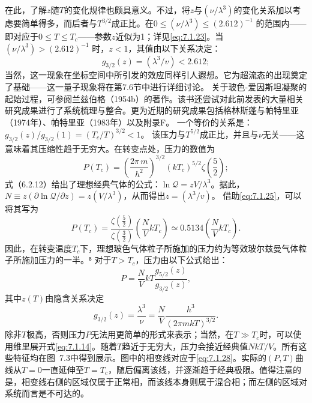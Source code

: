 在此，了解\(z\)随\(T\)的变化规律也颇具意义。不过，将\(z\)与\((\nu/\lambda^3)\)的变化关系加以考虑要简单得多，而后者与\(T^{3/2}\)成正比。在\(0 \leq (\nu/\lambda^3) \leq (2.612)^{-1}\) 的范围内——即对应于\(0 \leq T \leq T_c\)——参数\(z\)近似为1；详见\autoref{eq:7.1.23}。当\((\nu/\lambda^3) > (2.612)^{-1}\) 时，\(z < 1\)，其值由以下关系决定：
\begin{equation}\tag{7.1.27}\label{eq:7.1.27}
g _ { 3 / 2 } ( z ) = ( \lambda ^{3} / v ) < 2 . 61 2 ;
\end{equation}
当然，这一现象在坐标空间中所引发的效应同样引人遐想。它为超流态的出现奠定了基础——这一量子现象将在第7.6节中进行详细讨论。
关于玻色-爱因斯坦凝聚的起始过程，可参阅兰兹伯格（1954b）的著作。该书还尝试对此前发表的大量相关研究成果进行了系统梳理与整合。更为近期的研究成果包括格林斯蓬与帕特里亚（1974年）、帕特里亚（1983年）以及附录F。
一个等价的关系是：\(g_{3/2}(z)/g_{3/2}(1)=(T_{c}/T)^{3/2}<1\)。
该压力与\(T^{5/2}\)成正比，并且与\(\nu\)无关——这意味着其压缩性趋于无穷大。在转变点处，压力的数值为
\begin{equation}\tag{7.1.28}\label{eq:7.1.28}
P ( T _ { c } ) = \left( \frac { 2 \pi \, m } { h ^{2} } \right) ^{3 / 2} ( k T _ { c } ) ^{5 / 2} \zeta \left( \frac { 5 } { 2 } \right) ;
\end{equation}
式（6.2.12）给出了理想经典气体的公式：\(\ln\mathcal{Q}=zV/\lambda^{3}\)。据此，\(N\equiv z(\partial\ln\mathcal{Q}/\partial z)=z(V/\lambda^{3})\)，从而得出\(z=(\lambda^{3}/v)\)。
借助\autoref{eq:7.1.25}，可以将其写为
\begin{equation}\tag{7.1.29}\label{eq:7.1.29}
P ( T _ { c } ) = \frac { \zeta \left( \frac { 5 } { 2 } \right) } { \zeta \left( \frac { 3 } { 2 } \right) } \left( \frac { N } { V } k T _ { c } \right) \simeq 0 . 51 34 \left( \frac { N } { V } k T _ { c } \right) .
\end{equation}
因此，在转变温度\(T_{c}\)下，理想玻色气体粒子所施加的压力约为等效玻尔兹曼气体粒子所施加压力的一半。⁸ 对于\(T > T_{c}\)，压力由以下公式给出：
\begin{equation}\tag{7.1.30}\label{eq:7.1.30}
P = \frac { N } { V } k T \frac { g _ { 5 / 2 } ( z ) } { g _ { 3 / 2 } ( z ) } ,
\end{equation}
其中\(z(T)\)由隐含关系决定
\begin{equation}\tag{7.1.31}\label{eq:7.1.31}
g _ { 3 / 2 } ( z ) = \frac { \lambda ^{3} } { \nu } = \frac { N } { V } \frac { h ^{3} } { ( 2 \pi m k T ) ^{3 / 2} } .
\end{equation}
除非\(T\)极高，否则压力\(P\)无法用更简单的形式来表示；当然，在\(T \gg T_{c}\)时，可以使用维里展开式\autoref{eq:7.1.14}。随着\(T\)趋近于无穷大，压力会接近经典值\(NkT/V\)。所有这些特征均在图~7.3中得到展示。图中的相变线对应于\autoref{eq:7.1.28}。实际的\((P, T)\)曲线从\(T=0\)一直延伸至\(T=T_{c}\)，随后偏离该线，并逐渐趋于经典极限。值得注意的是，相变线右侧的区域仅属于正常相，而该线本身则属于混合相；而左侧的区域对系统而言是不可达的。

